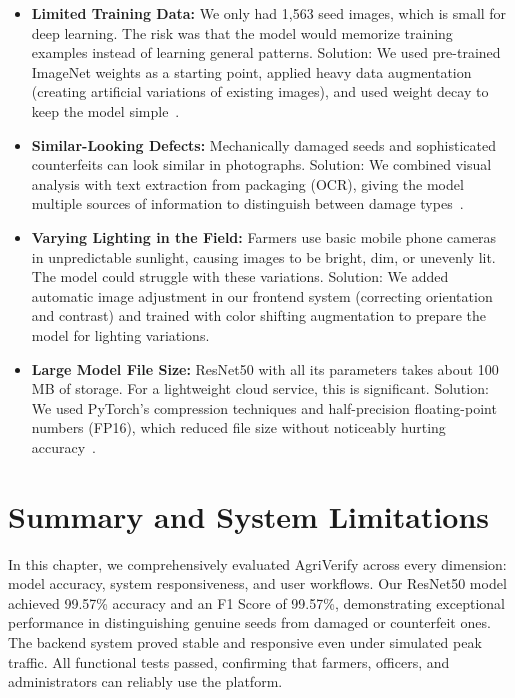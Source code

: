 \begin{itemize}
    \item \textbf{Limited Training Data:} We only had 1,563 seed images, which is small for deep learning. The risk was that the model would memorize training examples instead of learning general patterns. Solution: We used pre-trained ImageNet weights as a starting point, applied heavy data augmentation (creating artificial variations of existing images), and used weight decay to keep the model simple~\cite{krizhevsky2012imagenet, loshchilov2019adamw}.
    
    \item \textbf{Similar-Looking Defects:} Mechanically damaged seeds and sophisticated counterfeits can look similar in photographs. Solution: We combined visual analysis with text extraction from packaging (OCR), giving the model multiple sources of information to distinguish between damage types~\cite{mohanty2016}.
    
    \item \textbf{Varying Lighting in the Field:} Farmers use basic mobile phone cameras in unpredictable sunlight, causing images to be bright, dim, or unevenly lit. The model could struggle with these variations. Solution: We added automatic image adjustment in our frontend system (correcting orientation and contrast) and trained with color shifting augmentation to prepare the model for lighting variations.
    
    \item \textbf{Large Model File Size:} ResNet50 with all its parameters takes about 100 MB of storage. For a lightweight cloud service, this is significant. Solution: We used PyTorch's compression techniques and half-precision floating-point numbers (FP16), which reduced file size without noticeably hurting accuracy~\cite{pytorch2019}.
\end{itemize}

\section{Summary and System Limitations}
\label{sec:limitations}

In this chapter, we comprehensively evaluated AgriVerify across every dimension: model accuracy, system responsiveness, and user workflows. Our ResNet50 model achieved 99.57\% accuracy and an F1 Score of 99.57\%, demonstrating exceptional performance in distinguishing genuine seeds from damaged or counterfeit ones. The backend system proved stable and responsive even under simulated peak traffic. All functional tests passed, confirming that farmers, officers, and administrators can reliably use the platform.

